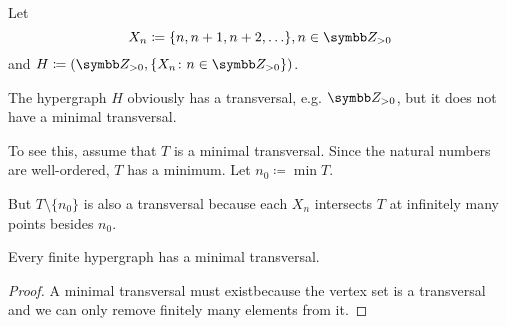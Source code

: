 \begin{example}\label{ex:no_minimal_set_transversal}
  Let
  \begin{equation*}
    X_n \coloneqq \{ n, n + 1, n + 2, \ldots \}, n \in \BZ_{>0}
  \end{equation*}
  and \( H \coloneqq (\BZ_{>0}, \{ X_n \colon n \in \BZ_{>0} \}) \).

  The hypergraph \( H \) obviously has a transversal, e.g. \( \BZ_{>0} \), but it does not have a minimal transversal.

  To see this, assume that \( T \) is a minimal transversal. Since the natural numbers are well-ordered, \( T \) has a minimum. Let \( n_0 \coloneqq \min T \).

  But \( T \setminus \{ n_0 \} \) is also a transversal because each \( X_n \) intersects \( T \) at infinitely many points besides \( n_0 \).
\end{example}

\begin{proposition}\label{thm:finite_hypergraphs_have_minimal_transversal}
  Every finite hypergraph has a minimal transversal.
\end{proposition}
\begin{proof}
  A minimal transversal must exist\LEM because the vertex set is a transversal and we can only remove finitely many elements from it.
\end{proof}
